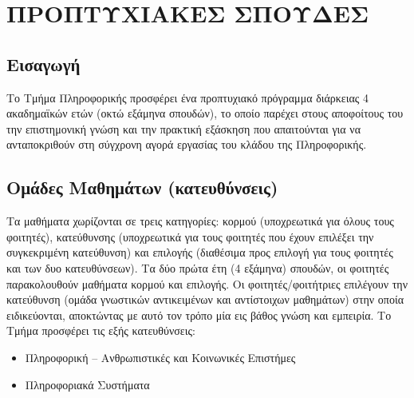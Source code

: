 \hypertarget{ux3c0ux3c1ux3bfux3c0ux3c4ux3c5ux3c7ux3b9ux3b1ux3baux3b5ux3c3-ux3c3ux3c0ux3bfux3c5ux3b4ux3b5ux3c3}{%
\chapter{ΠΡΟΠΤΥΧΙΑΚΕΣ
ΣΠΟΥΔΕΣ}\label{ux3c0ux3c1ux3bfux3c0ux3c4ux3c5ux3c7ux3b9ux3b1ux3baux3b5ux3c3-ux3c3ux3c0ux3bfux3c5ux3b4ux3b5ux3c3}}

\hypertarget{ux3b5ux3b9ux3c3ux3b1ux3b3ux3c9ux3b3ux3ae}{%
\section{Εισαγωγή}\label{ux3b5ux3b9ux3c3ux3b1ux3b3ux3c9ux3b3ux3ae}}

Το Τμήμα Πληροφορικής προσφέρει ένα προπτυχιακό πρόγραμμα διάρκειας 4
ακαδημαϊκών ετών (οκτώ εξάμηνα σπουδών), το οποίο παρέχει στους
αποφοίτους του την επιστημονική γνώση και την πρακτική εξάσκηση που
απαιτούνται για να ανταποκριθούν στη σύγχρονη αγορά εργασίας του κλάδου
της Πληροφορικής.

\hypertarget{ux3bfux3bcux3acux3b4ux3b5ux3c2-ux3bcux3b1ux3b8ux3b7ux3bcux3acux3c4ux3c9ux3bd-ux3baux3b1ux3c4ux3b5ux3c5ux3b8ux3cdux3bdux3c3ux3b5ux3b9ux3c2}{%
\section{Ομάδες Μαθημάτων
(κατευθύνσεις)}\label{ux3bfux3bcux3acux3b4ux3b5ux3c2-ux3bcux3b1ux3b8ux3b7ux3bcux3acux3c4ux3c9ux3bd-ux3baux3b1ux3c4ux3b5ux3c5ux3b8ux3cdux3bdux3c3ux3b5ux3b9ux3c2}}

Τα μαθήματα χωρίζονται σε τρεις κατηγορίες: κορμού (υποχρεωτικά για
όλους τους φοιτητές), κατεύθυνσης (υποχρεωτικά για τους φοιτητές που
έχουν επιλέξει την συγκεκριμένη κατεύθυνση) και επιλογής (διαθέσιμα προς
επιλογή για τους φοιτητές και των δυο κατευθύνσεων). Τα δύο πρώτα έτη (4
εξάμηνα) σπουδών, οι φοιτητές παρακολουθούν μαθήματα κορμού και
επιλογής. Οι φοιτητές/φοιτήτριες επιλέγουν την κατεύθυνση (ομάδα
γνωστικών αντικειμένων και αντίστοιχων μαθημάτων) στην οποία
ειδικεύονται, αποκτώντας με αυτό τον τρόπο μία εις βάθος γνώση και
εμπειρία. Το Τμήμα προσφέρει τις εξής κατευθύνσεις:

\begin{itemize}
\tightlist
\item
  Πληροφορική -- Ανθρωπιστικές και Κοινωνικές Επιστήμες
\item
  Πληροφοριακά Συστήματα
\end{itemize}

